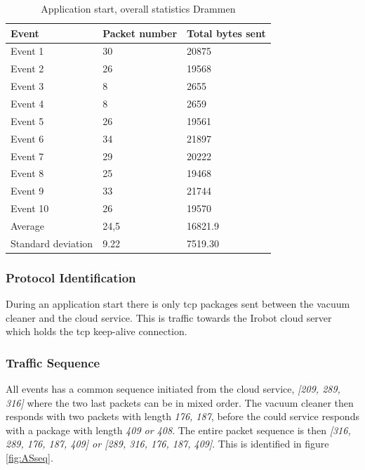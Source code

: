 \begin{table}[H]
\centering
\caption{Application start, overall statistics Drammen}
\label{tab:ASoverallDRA}
\begin{tabular}{|l|l|l|}
\hline
\textbf{Event} & \textbf{Packet number} & \textbf{Total bytes sent} \\ \hline
Event 1        & 30                     & 20875                     \\ \hline
Event 2        & 26                     & 19568                     \\ \hline
Event 3        & 8                      & 2655                      \\ \hline
Event 4        & 8                      & 2659                      \\ \hline
Event 5        & 26                     & 19561                     \\ \hline
Event 6        & 34                     & 21897                     \\ \hline
Event 7        & 29                     & 20222                     \\ \hline
Event 8        & 25                     & 19468                     \\ \hline
Event 9        & 33                     & 21744                     \\ \hline
Event 10       & 26                     & 19570                     \\ \hline
Average        & 24,5                   & 16821.9                   \\ \hline
Standard deviation        & 9.22
       & 7519.30               \\ \hline
\end{tabular}
\end{table}

\subsubsection{Protocol Identification}
During an application start there is only tcp packages sent between the vacuum cleaner and the cloud service. This is traffic towards the Irobot cloud server which holds the tcp keep-alive connection. 

\subsubsection{Traffic Sequence}
All events has a common sequence initiated from the cloud service, \textit{[209, 289, 316]} where the two last packets can be in mixed order. The vacuum cleaner then responds with two packets with length \textit{176, 187}, before the could service responds with a package with length \textit{409 or 408}. The entire packet sequence is then \textit{[316, 289, 176, 187, 409] or [289, 316, 176, 187, 409]}. This is identified in figure \ref{fig:ASseq}.

